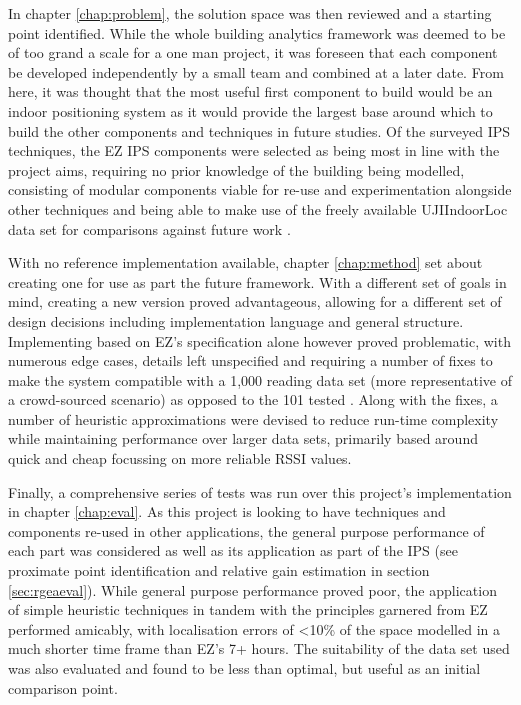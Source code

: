 \documentclass{UoYCSproject}
\begin{document}
        In chapter \ref{chap:problem}, the solution space was then reviewed and a starting point identified. While the whole building analytics framework was deemed to be of too grand a scale for a one man project, it was foreseen that each component be developed independently by a small team and combined at a later date. From here, it was thought that the most useful first component to build would be an indoor positioning system as it would provide the largest base around which to build the other components and techniques in future studies. Of the surveyed IPS techniques, the EZ IPS components were selected as being most in line with the project aims, requiring no prior knowledge of the building being modelled, consisting of modular components viable for re-use and experimentation alongside other techniques and being able to make use of the freely available UJIIndoorLoc data set for comparisons against future work \citep{chintalapudi2010indoor, torres2014ujiindoorloc}.
        
        With no reference implementation available, chapter \ref{chap:method} set about creating one for use as part the future framework. With a different set of goals in mind, creating a new version proved advantageous, allowing for a different set of design decisions including implementation language and general structure. Implementing based on EZ's specification alone however proved problematic, with numerous edge cases, details left unspecified and requiring a number of fixes to make the system compatible with a 1,000 reading data set (more representative of a crowd-sourced scenario) as opposed to the 101 tested \citep{chintalapudi2010indoor}. Along with the fixes, a number of heuristic approximations were devised to reduce run-time complexity while maintaining performance over larger data sets, primarily based around quick and cheap focussing on more reliable RSSI values.
        
        Finally, a comprehensive series of tests was run over this project's implementation in chapter \ref{chap:eval}. As this project is looking to have techniques and components re-used in other applications, the general purpose performance of each part was considered as well as its application as part of the IPS (see proximate point identification and relative gain estimation in section \ref{sec:rgeaeval}). While general purpose performance proved poor, the application of simple heuristic techniques in tandem with the principles garnered from EZ performed amicably, with localisation errors of <10\% of the space modelled in a much shorter time frame than EZ's 7+ hours. The suitability of the data set used was also evaluated and found to be less than optimal, but useful as an initial comparison point.
        
\end{document}

